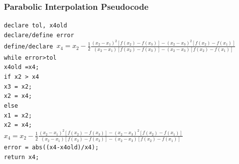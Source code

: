 \documentclass{if-beamer}
\begin{document}

\begin{frame}
	\frametitle{Parabolic Interpolation Pseudocode}
	
	\texttt{declare tol, x4old}\\
	\texttt{declare/define error}\\\vspace{10pt}
	\texttt{define/declare $x_4 = x_2 - \frac{1}{2}\frac{(x_2-x_1)^2[f(x_2)-f(x_3)]-(x_2-x_3)^2[f(x_2)-f(x_1)]}{(x_2-x_1)[f(x_2)-f(x_3)]-(x_2-x_3)[f(x_2)-f(x_1)]}$}\\\vspace{10pt}
	\texttt{while error>tol}\\
	\texttt{\qquad x4old =x4;}\\
	\texttt{\qquad if x2 > x4}\\
	\texttt{\qquad \qquad x3 = x2;}\\
	\texttt{\qquad \qquad x2 = x4;}\\
	\texttt{\qquad else}\\
	\texttt{\qquad \qquad x1 = x2;}\\
	\texttt{\qquad \qquad x2 = x4;}\\
	\texttt{\qquad \qquad $x_4 = x_2 - \frac{1}{2}\frac{(x_2-x_1)^2[f(x_2)-f(x_3)]-(x_2-x_3)^2[f(x_2)-f(x_1)]}{(x_2-x_1)[f(x_2)-f(x_3)]-(x_2-x_3)[f(x_2)-f(x_1)]}$}\\
	\texttt{\qquad error = abs((x4-x4old)/x4);} \\
	\texttt{return x4;}	
\end{frame}
\end{document}
